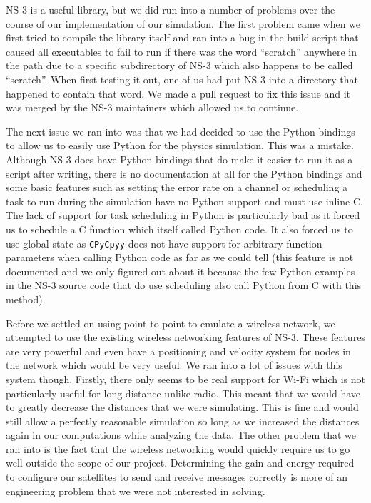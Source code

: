 \documentclass[a4paper,12pt]{article}
\newcommand{\CC}{C\nolinebreak\hspace{-.05em}\raisebox{.4ex}{\tiny\bf
    +}\nolinebreak\hspace{-.10em}\raisebox{.4ex}{\tiny\bf +}}
\def\CC{{C\nolinebreak[4]\hspace{-.05em}\raisebox{.4ex}{\tiny\bf ++}}}
\begin{document}
NS-3 is a useful library, but we did run into a number of problems over the
course of our implementation of our simulation. The first problem came when we
first tried to compile the library itself and ran into a bug in the build script
that caused all executables to fail to run if there was the word ``scratch''
anywhere in the path due to a specific subdirectory of NS-3 which also happens
to be called ``scratch''. When first testing it out, one of us had put NS-3 into
a directory that happened to contain that word. We made a pull request to fix
this issue and it was merged by the NS-3 maintainers which allowed us to
continue.

The next issue we ran into was that we had decided to use the Python bindings to
allow us to easily use Python for the physics simulation. This was a mistake.
Although NS-3 does have Python bindings that do make it easier to run it as a
script after writing, there is no documentation at all for the Python bindings
and some basic features such as setting the error rate on a channel or
scheduling a task to run during the simulation have no Python support and must
use inline \CC. The lack of support for task scheduling in Python is
particularly bad as it forced us to schedule a \CC{} function which itself
called Python code. It also forced us to use global state as \texttt{CPyCpyy}
does not have support for arbitrary function parameters when calling Python code
as far as we could tell (this feature is not documented and we only figured out
about it because the few Python examples in the NS-3 source code that do use
scheduling also call Python from \CC{} with this method).

Before we settled on using point-to-point to emulate a wireless network, we
attempted to use the existing wireless networking features of NS-3. These
features are very powerful and even have a positioning and velocity system for
nodes in the network which would be very useful. We ran into a lot of issues
with this system though. Firstly, there only seems to be real support for Wi-Fi
which is not particularly useful for long distance unlike radio. This meant that
we would have to greatly decrease the distances that we were simulating. This is
fine and would still allow a perfectly reasonable simulation so long as we
increased the distances again in our computations while analyzing the data. The
other problem that we ran into is the fact that the wireless networking would
quickly require us to go well outside the scope of our project. Determining the
gain and energy required to configure our satellites to send and receive
messages correctly is more of an engineering problem that we were not interested
in solving.
\end{document}
